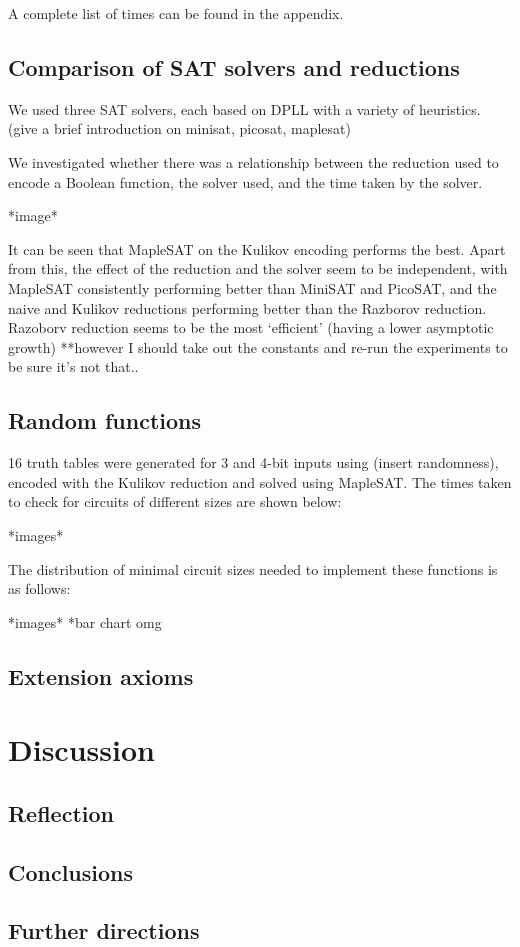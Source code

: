 \documentclass{article}
\begin{document}
A complete list of times can be found in the appendix.

\subsection{Comparison of SAT solvers and reductions}

We used three SAT solvers, each based on DPLL with a variety of heuristics. (give a brief introduction on minisat, picosat, maplesat)

We investigated whether there was a relationship between the reduction used to encode a Boolean function, the solver used, and the time taken by the solver.

*image*


It can be seen that MapleSAT on the Kulikov encoding performs the best. Apart from this, the effect of the reduction and the solver seem to be independent, with MapleSAT consistently performing better than MiniSAT and PicoSAT, and the naive and Kulikov reductions performing better than the Razborov reduction. Razoborv reduction seems to be the most ‘efficient’ (having a lower asymptotic growth) **however I should take out the constants and re-run the experiments to be sure it’s not that..

\subsection{Random functions}

16 truth tables were generated for 3 and 4-bit inputs using (insert randomness), encoded with the Kulikov reduction and solved using MapleSAT. The times taken to check for circuits of different sizes are shown below:

*images*

The distribution of minimal circuit sizes needed to implement these functions is as follows:

*images* *bar chart omg

\subsection{Extension axioms}

\section{Discussion}

\subsection{Reflection}

\subsection{Conclusions}

\subsection{Further directions}

 

\end{document}
